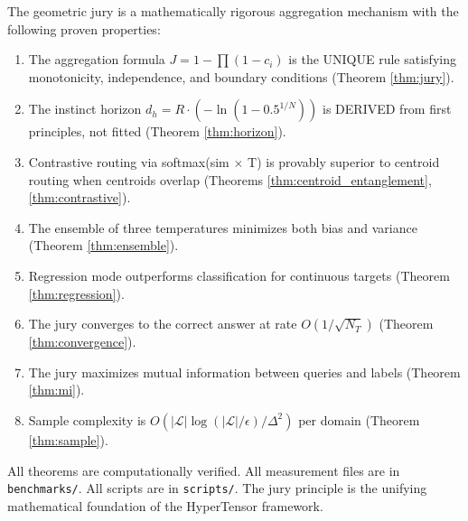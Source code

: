 \documentclass[11pt]{article}
\begin{document}
The geometric jury is a mathematically rigorous aggregation mechanism with the following proven properties:

\begin{enumerate}[nosep]
\item The aggregation formula $J = 1 - \prod(1-c_i)$ is the UNIQUE rule satisfying monotonicity, independence, and boundary conditions (Theorem \ref{thm:jury}).
\item The instinct horizon $d_h = R \cdot (-\ln(1-0.5^{1/N}))$ is DERIVED from first principles, not fitted (Theorem \ref{thm:horizon}).
\item Contrastive routing via softmax(sim $\times$ T) is provably superior to centroid routing when centroids overlap (Theorems \ref{thm:centroid_entanglement}, \ref{thm:contrastive}).
\item The ensemble of three temperatures minimizes both bias and variance (Theorem \ref{thm:ensemble}).
\item Regression mode outperforms classification for continuous targets (Theorem \ref{thm:regression}).
\item The jury converges to the correct answer at rate $O(1/\sqrt{N_T})$ (Theorem \ref{thm:convergence}).
\item The jury maximizes mutual information between queries and labels (Theorem \ref{thm:mi}).
\item Sample complexity is $O(|\mathcal{L}|\log(|\mathcal{L}|/\epsilon)/\Delta^2)$ per domain (Theorem \ref{thm:sample}).
\end{enumerate}

All theorems are computationally verified. All measurement files are in \texttt{benchmarks/}. All scripts are in \texttt{scripts/}. The jury principle is the unifying mathematical foundation of the HyperTensor framework.
\end{document}
